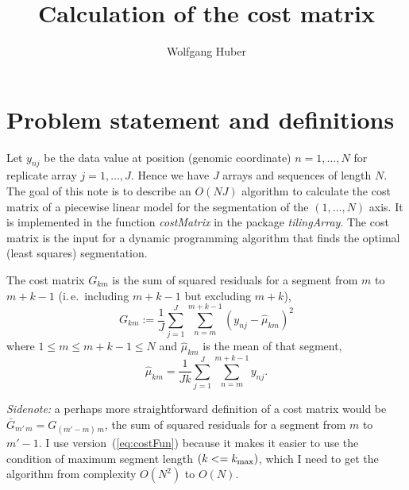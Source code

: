 \documentclass[11pt]{article}
\begin{document}
\title{Calculation of the cost matrix}
\author{Wolfgang Huber}
\maketitle

\section{Problem statement and definitions}
Let $y_{nj}$ be the data value at position (genomic coordinate)
$n=1,\ldots,N$ for replicate array $j=1,\ldots,J$. Hence we have $J$
arrays and sequences of length $N$.  The goal of this note is to
describe an $O(NJ)$ algorithm to calculate the cost matrix of a
piecewise linear model for the segmentation of the $(1,\ldots,N)$ axis.
It is implemented in the function \textit{costMatrix} in the package
\textit{tilingArray}. The cost matrix is the input for a dynamic
programming algorithm that finds the optimal (least squares)
segmentation.


The cost matrix $G_{km}$ is the sum of squared residuals for a segment
from $m$ to $m+k-1$ (i.\,e.\ including $m+k-1$ but excluding $m+k$),
\begin{equation}\label{eq:costFun}
G_{km} := \frac{1}{J} \sum_{j=1}^J \sum_{n=m}^{m+k-1} 
\left(y_{nj} - \hat{\mu}_{km} \right)^2
\end{equation}
where $1\le m \le m+k-1\le N$ and $\hat{\mu}_{km}$ is the mean of that segment,
\begin{equation}\label{eq:defmu}
\hat{\mu}_{km} = \frac{1}{Jk} \sum_{j=1}^J \sum_{n=m}^{m+k-1} y_{nj}.
\end{equation}

\textit{Sidenote:} a perhaps more straightforward definition of a cost
matrix would be $\bar{G}_{m'\,m} = G_{(m'-m)\,m}$, the sum of squared
residuals for a segment from $m$ to $m'-1$. I use
version~(\ref{eq:costFun}) because it makes it easier to use the
condition of maximum segment length $(k<=k_{\mbox{\scriptsize max}})$, 
which I need to get the algorithm from complexity $O(N^2)$ to $O(N)$.

\newpage
\end{document}
